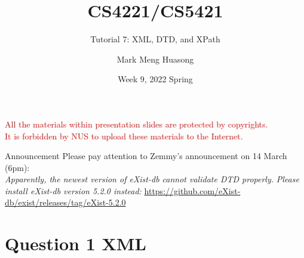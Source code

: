 \title{CS4221/CS5421}

\subtitle{Tutorial 7: XML, DTD, and XPath}

\author{Mark Meng Huasong}



\date{Week 9, 2022 Spring}


\begin{frame}
	\titlepage
	\begin{tcolorbox}
		\begin{center}
			{\scriptsize \textcolor{red}{All the materials within presentation slides are protected by copyrights.\\
					It is forbidden by NUS to upload these materials to the Internet.}}
		\end{center}
	\end{tcolorbox}
\end{frame}

\begin{frame}[fragile]{Announcement}
Please pay attention to Zemmy's announcement on 14 March (6pm): \\\vspace{20pt}
\textit{Apparently, the newest version of eXist-db cannot validate DTD properly.}
\textit{Please install eXist-db version 5.2.0 instead:} \url{https://github.com/eXist-db/exist/releases/tag/eXist-5.2.0}

\end{frame}

\section*{Question 1 XML}

